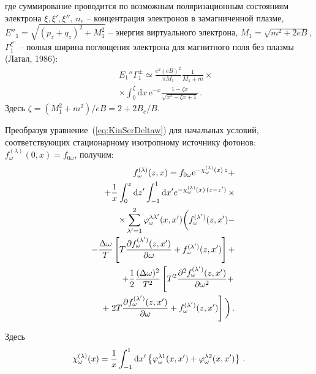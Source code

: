 \documentclass{pazh2col-win}
\newcommand{\dd}{\mathrm{d}} %
\newcommand{\eee}{\mathrm{e}} %
\begin{document}
%
где суммирование проводится по возможным поляризационным состояниям электрона $\xi, \xi', \xi''$, \linebreak $n_e$ -- концентрация электронов в замагниченной плазме, $E''_1 = \sqrt{(p_z+q_z)^2 + M_1^2}$ -- энергия виртуального электрона, $M_1=\sqrt{m^2+2 eB}$, \linebreak $\Gamma_1^{\xi''}$ -- полная ширина поглощения электрона для магнитного поля без плазмы (Латал, 1986):
%
\begin{eqnarray}
\label{Gamma}
\nonumber
&&E_1''\Gamma_1^{\pm} \simeq \frac{e^2 (eB)^2}{\pi M_1}\frac{1}{M_1\pm m} \times
\\
&&\times\int_{0}^{\zeta}\dd x\, \eee^{-x} \frac{1-\zeta x}{\sqrt{x^2-\zeta x+1}}\, .
\end{eqnarray}
%
Здесь $\zeta=(M_1^2+m^2)/eB=2+2B_e/B$.

Преобразуя уравнение~(\ref{eq:KinSerDeltaw}) для начальных условий, соответствующих стационарному изотропному источнику фотонов: $f^{(\lambda)}_\omega(0,x)=f_{0\omega}$, получим:
%
\begin{eqnarray}
\label{FormSol}
\nonumber
&&f_\omega^{(\lambda)}(z,x)=f_{0\omega} \eee^{-{\cal \chi}_\omega^{(\lambda)}(x)\, z} +
\\
\nonumber
&&+ \frac{1}{x}\int_{0}^{z}\dd z'\int_{-1}^{1}\dd x' e^{-{\cal \chi}_\omega^{(\lambda)}(x)\, (z-z')}\,\times
\\
\nonumber
&&\times \sum_{\lambda'=1}^2\varphi_\omega^{\lambda 	\lambda'}(x,x')\bigg(f_\omega^{(\lambda')}(z,x')- 
\\
\nonumber
&&-\frac{\Delta \omega}{T} \left[	T \frac{\partial f_\omega^{(\lambda')}(z,x')}{\partial \omega} + f_\omega^{(\lambda')}(z,x') \right]+
\\
\nonumber
&&+ \frac{1}{2}\frac{(\Delta \omega)^2}{T^2}\left[	T^2 \frac{\partial^2 f_\omega^{(\lambda')}(z,x')}{\partial \omega^2} + \right.
\\
&&+\left. 2T \frac{\partial f_\omega^{(\lambda')}(z,x')}{\partial \omega}+f_\omega^{(\lambda')}(z,x')\right]\bigg)\, .
\end{eqnarray}
%

Здесь
\begin{eqnarray}
\label{chi}
{\cal \chi}_\omega^{(\lambda)}(x) = \frac{1}{x} \int_{-1}^{1} \dd x' \left\{\varphi^{\lambda 1}_\omega(x,x')+\varphi^{\lambda 2}_\omega(x,x')\right\}\, .
\end{eqnarray}
%
\end{document}
